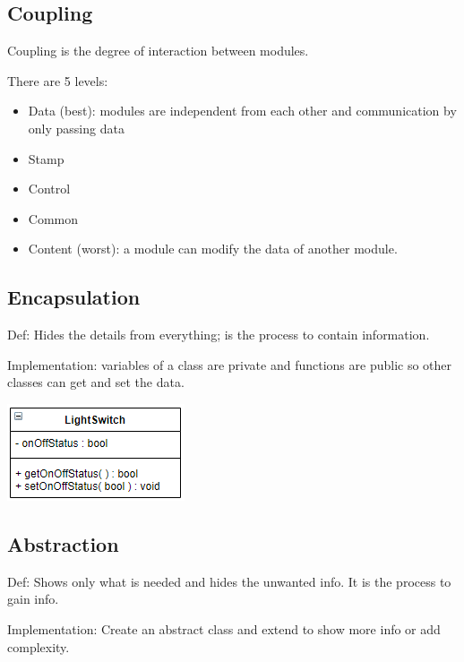 \documentclass{article}
\begin{document}
    \subsection*{Coupling}

    Coupling is the degree of interaction between modules.

    There are 5 levels:
    \begin{itemize}
        \item Data (best): modules are independent from each other and communication by 
        only passing data 
        \item Stamp 
        \item Control 
        \item Common 
        \item Content (worst): a module can modify the data of another module.
    \end{itemize}

    \subsection*{Encapsulation}

    Def: Hides the details from everything; is the process to contain information.

    Implementation: variables of a class are private and functions are public so other 
    classes can get and set the data.

    \begin{center}
        \includegraphics[scale=0.7]{encapsulation.png}
    \end{center}

    \subsection*{Abstraction}

    Def: Shows only what is needed and hides the unwanted info. It is the process to gain 
    info.

    Implementation: Create an abstract class and extend to show more info or add complexity.
\end{document}
